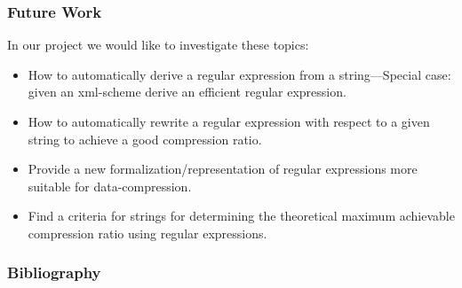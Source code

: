 \documentclass[slidestop,compress,mathserif, xcolor=table]{beamer}
\begin{document}
\begin{frame}[fragile]
  \frametitle{Future Work}

  In our project we would like to investigate these topics:

  \begin{itemize}
  \item How to automatically derive a regular expression from a string---Special
    case: given an xml-scheme derive an efficient regular expression.
  \item How to automatically rewrite a regular expression with respect to a
    given string to achieve a good compression ratio.
  \item Provide a new formalization/representation of regular expressions more
    suitable for data-compression.
  \item Find a criteria for strings for determining the theoretical maximum
    achievable compression ratio using regular expressions.
  \end{itemize}

\end{frame}


     




\begin{frame}
  \frametitle{Bibliography}
  
  
  
  
\end{frame}
\end{document}
